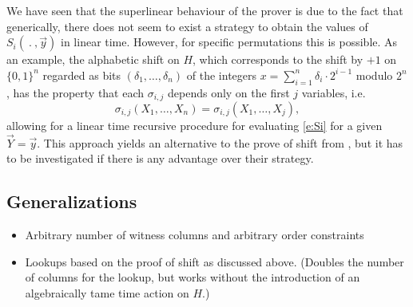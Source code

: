 \documentclass[11pt]{article}
\theoremstyle{definition}
\theoremstyle{remark}
\begin{document}
We have seen that the superlinear behaviour of the prover is due to the fact that generically, there does not seem to exist a strategy to obtain the values of $S_i(\:.\:,\vec y)$ in linear time.    
However, for specific permutations this is possible.
As an example, the alphabetic shift on $H$, which corresponds to the shift by $+1$ on $\{0,1\}^n$ regarded as bits $(\delta_1,\ldots, \delta_n)$ of the integers $x = \sum_{i=1}^n \delta_i \cdot 2^{i-1}$ modulo $2^n$, has the property that each $\sigma_{i,j}$ depends only on the first $j$ variables, i.e.
 \[
\sigma_{i,j}(X_1,\ldots, X_n) = \sigma_{i,j}(X_1,\ldots, X_j),
\] 
allowing for a linear time recursive procedure for evaluating 
\eqref{e:Si} for a given $\vec Y = \vec y$.
This approach yields an alternative to the prove of shift from \cite{TensorCodes}, but it has to be investigated if there is any advantage over their strategy.

\subsection{Generalizations}

\begin{itemize}
\item
Arbitrary number of witness columns and arbitrary order constraints
\item
Lookups based on the proof of shift as discussed above. (Doubles the number of columns for the lookup, but works without the introduction of an algebraically tame time action on $H$.) 
\end{itemize}


\end{document}
